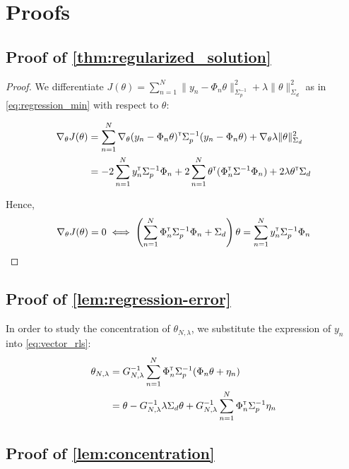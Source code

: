 \documentclass{article}
\begin{document}
\printbibliography

\appendix

\section{Proofs}

\subsection{Proof of \autoref{thm:regularized_solution}}

\begin{proof}
We differentiate $J(\theta) = \sum_{n=1}^N \|y_n -\Phi_n\theta\|_{\Sigma_p^{-1}}^2 + \lambda\|\theta\|_{\Sigma_d}^2$ as in  \eqref{eq:regression_min} with respect to $\theta$:

\begin{align*}
    \nabla_{\theta} J(\theta) &= \sum_{n=1}^N\nabla_{\theta} (y_n - \Phi_n\theta)^{\mathsf{\scriptscriptstyle T}}\Sigma_p^{-1}(y_n - \Phi_n\theta) + \nabla_{\theta} \lambda\|\theta\|_{\Sigma_d}^2\\
    &= -2\sum_{n=1}^N y_n^{\mathsf{\scriptscriptstyle T}}\Sigma_p^{-1}\Phi_n + 2\sum_{n=1}^N\theta^{\mathsf{\scriptscriptstyle T}}(\Phi_n^{\mathsf{\scriptscriptstyle T}}\Sigma^{-1}\Phi_n) +  2 \lambda \theta^{\mathsf{\scriptscriptstyle T}} \Sigma_d
\end{align*}

Hence,
\begin{align*}
    \nabla_{\theta} J(\theta) = 0 \iff \left(\sum_{n=1}^N\Phi_n^{\mathsf{\scriptscriptstyle T}}\Sigma_p^{-1}\Phi_n + \Sigma_d\right)\theta = \sum_{n=1}^N y_n^{\mathsf{\scriptscriptstyle T}}\Sigma_p^{-1}\Phi_n
\end{align*}
\end{proof}

\subsection{Proof of \autoref{lem:regression-error}}

In order to study the concentration of $\theta_{N,\lambda}$, we substitute the expression of $y_n$ into \eqref{eq:vector_rls}:
\begin{align*}
    \theta_{N,\lambda} &= G_{N, \lambda}^{-1} \sum_{n=1}^N \Phi_n^{\mathsf{\scriptscriptstyle T}} \Sigma_p^{-1} (\Phi_n\theta +\eta_n)\\
    &= \theta - G_{N, \lambda}^{-1}\lambda\Sigma_d\theta + G_{N, \lambda}^{-1}\sum_{n=1}^N \Phi_n^{\mathsf{\scriptscriptstyle T}} \Sigma_p^{-1}\eta_n
\end{align*}

\subsection{Proof of \autoref{lem:concentration}}
\end{document}
